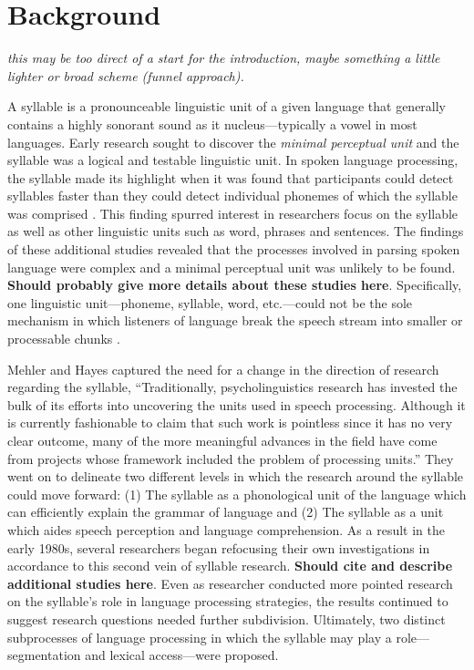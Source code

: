 \section{Background}
\emph{this may be too direct of a start for the introduction, maybe something a little lighter or broad scheme (funnel approach).}

A syllable is a pronounceable linguistic unit of a given language that generally contains a highly sonorant sound as it nucleus—typically a vowel in most languages. Early research sought to discover the \emph{minimal perceptual unit} and the syllable was a logical and testable linguistic unit. In spoken language processing, the syllable made its highlight when it was found that participants could detect syllables faster than they could detect individual phonemes of which the syllable was comprised \citep*{Savin1970-oy}. This finding spurred interest in researchers focus on the syllable as well as other linguistic units such as word, phrases and sentences. The findings of these additional studies revealed that the processes involved in parsing spoken language were complex and a minimal perceptual unit was unlikely to be found. \textbf{Should probably give more details about these studies here}. Specifically, one linguistic unit—phoneme, syllable, word, etc.—could not be the sole mechanism in which listeners of language break the speech stream into smaller or processable chunks \citep{Foss1973-ll,Healy1976-js,McNeill1973-bo}. 

Mehler and Hayes \parencite*{Mehler1981-wp} captured the need for a change in the direction of research regarding the syllable, “Traditionally, psycholinguistics research has invested the bulk of its efforts into uncovering the units used in speech processing. Although it is currently fashionable to claim that such work is pointless since it has no very clear outcome, many of the more meaningful advances in the field have come from projects whose framework included the problem of processing units.” They went on to delineate two different levels in which the research around the syllable could move forward: (1) The syllable as a phonological unit of the language which can efficiently explain the grammar of language and (2) The syllable as a unit which aides speech perception and language comprehension. As a result in the early 1980s, several researchers began refocusing their own investigations in accordance to this second vein of syllable research. \textbf{Should cite and describe additional studies here}. Even as researcher conducted more pointed research on the syllable's role in language processing strategies, the results continued to suggest research questions needed further subdivision. Ultimately, two distinct subprocesses of language processing in which the syllable may play a role---segmentation and lexical access---were proposed. 

